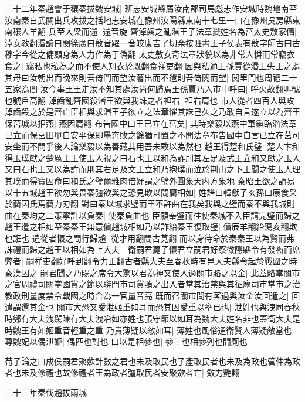 三十二年秦趙會于穰秦拔魏安城|{
	班志安城縣屬汝南郡司馬彪志作安城時魏地南至汝南秦自武關出兵攻拔之括地志安城在豫州汝陽縣東南十七里一曰在豫州吳房縣東南穰人羊翻}
兵至大梁而還|{
	還音旋}
齊淖齒之亂湣王子法章變姓名為莒太史敫家傭|{
	淖女教翻湣讀曰閔徐廣曰敫音躍一音皎康吉了切余按班書王子侯表有敫字師古曰古穆字今從之傭顧身為人力作為于偽翻}
太史敫女奇法章狀貌以為非常人憐而常竊衣食之|{
	竊私也私為之而不使人知衣於既翻食祥吏翻}
因與私通王孫賈從湣王失王之處其母曰汝朝出而晩來則吾倚門而望汝暮出而不還則吾倚閭而望|{
	閭里門也周禮二十五家為閭}
汝今事王王走汝不知其處汝尚何歸焉王孫賈乃入市中呼曰|{
	呼火故翻叫號也號戶高翻}
淖齒亂齊國殺湣王欲與我誅之者袒右|{
	袒右肩也}
市人從者四百人與攻淖齒殺之於是齊亡臣相與求湣王子欲立之法章懼其誅己久之乃敢自言遂立以為齊王保莒城以拒燕|{
	燕因肩翻}
布告國中曰王已立在莒矣|{
	其時樂毅以燕中軍鎭臨淄法章已立而保莒田單自安平保即墨奔敗之餘猶可置之不問法章布告國中自言已立在莒可安坐而不問乎後人論樂毅以為善藏其用吾未敢以為然也}
趙王得楚和氏璧|{
	楚人卞和得玉璞獻之楚厲王王使玉人視之曰石也王以和為詐刖其左足及武王立和又獻之玉人又曰石也王又以為詐而刖其右足及文王立和乃抱璞而泣於荆山之下王聞之使玉人理其璞而得寶因命曰和氏之璧爾雅肉倍好謂之璧外圓象天内方象地}
秦昭王欲之請易以十五城趙王欲勿與畏秦彊欲與之恐見欺以問藺相如|{
	姓譜曰韓獻子玄孫曰康食采於藺因氏焉藺力刃翻}
對曰秦以城求璧而王不許曲在我矣我與之璧而秦不與我城則曲在秦均之二策寧許以負秦|{
	使秦負曲也}
臣願奉璧而往使秦城不入臣請完璧而歸之趙王遣之相如至秦秦王無意償趙城相如乃以詐紿秦王復取璧|{
	償辰羊翻紿蕩亥翻欺也誑也}
遣從者懷之間行歸趙|{
	從才用翻間古莧翻}
而以身待命於秦秦王以為賢而弗誅禮而歸之趙王以相如為上大夫　衛嗣君薨子懷君立嗣君好察微隱縣令有發褥而席弊者|{
	嗣祥吏翻好呼到翻令力正翻古者縣大夫至春秋時有邑大夫縣令起於戰國之時秦漢因之}
嗣君聞之乃賜之席令大驚以君為神又使人過關市賂之以金|{
	此蓋賂掌關市之官周禮司關掌國貨之節以聨門市司貨賄之出入者掌其治禁與其征廛司市掌市之治教政刑量度禁令戰國之時合為一官量音亮}
既而召關市問有客過與汝金汝回遣之|{
	回遣謂還其金也}
關市大恐又愛泄姬重如耳而恐其因愛重以壅已也|{
	泄姓也與洩同春秋時鄭有大夫洩駕陳有大夫洩冶如亦姓也張守節以如耳為魏大夫姓名非也蓋衛大夫是時魏王有如姬重音輕重之重}
乃貴薄疑以敵如耳|{
	薄姓也風俗通衛賢人薄疑敵當也}
尊魏妃以偶泄姬|{
	偶匹也對也}
曰以是相參也|{
	參三也相參列也間厠也}


荀子論之曰成侯嗣君聚歛計數之君也未及取民也子產取民者也未及為政也管仲為政者也未及修禮也故修禮者王為政者彊取民者安聚歛者亡|{
	斂力艷翻}


三十三年秦伐趙拔兩城

